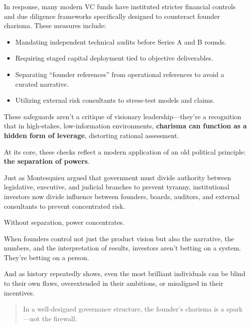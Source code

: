     \medskip
    
    In response, many modern VC funds have instituted stricter financial controls and due diligence frameworks specifically designed to counteract founder charisma. These measures include:

    \begin{itemize}
        \item Mandating independent technical audits before Series A and B rounds.
        \item Requiring staged capital deployment tied to objective deliverables.
        \item Separating “founder references” from operational references to avoid a curated narrative.
        \item Utilizing external risk consultants to stress-test models and claims.
    \end{itemize}
    
    These safeguards aren’t a critique of visionary leadership—they’re a recognition that in high-stakes, low-information environments, \textbf{charisma can function as a hidden form of leverage}, distorting rational assessment.
    
    \medskip
    
    At its core, these checks reflect a modern application of an old political principle:  
    \textbf{the separation of powers}.
    
    Just as Montesquieu argued that government must divide authority between legislative, executive, and judicial branches to prevent tyranny, institutional investors now divide influence between founders, boards, auditors, and external consultants to prevent concentrated risk.
    
    \medskip
    
    Without separation, power concentrates.
    
    When founders control not just the product vision but also the narrative, the numbers, and the interpretation of results, investors aren’t betting on a system.  
    They’re betting on a person.
    
    And as history repeatedly shows, even the most brilliant individuals can be blind to their own flaws, overextended in their ambitions, or misaligned in their incentives.
    
    \medskip
    
    \begin{quote}
    In a well-designed governance structure, the founder’s charisma is a spark—not the firewall.
    \end{quote}
    
